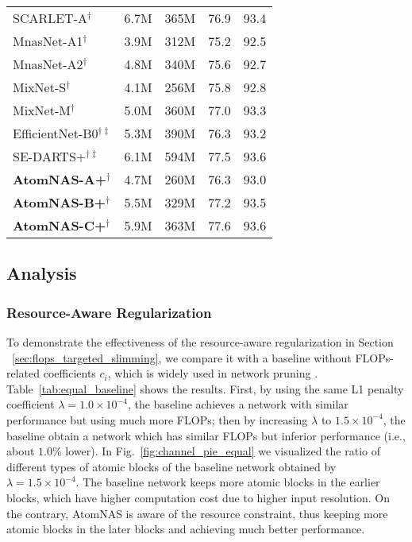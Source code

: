 \documentclass{article} \usepackage{iclr2020_conference,times}
\newcommand{\flops}{FLOPs\xspace}
\begin{document}
\begin{table}[t]
\begin{center}
\begin{tabular}{lllll}
\midrule

SCARLET-A$^\dag$ \citep{chu2019scarletnas} & 6.7M & 365M & 76.9 & 93.4 \\
MnasNet-A1$^\dag$ \citep{tan2019mnasnet}      & 3.9M & 312M & 75.2 & 92.5 \\
MnasNet-A2$^\dag$      & 4.8M & 340M & 75.6 & 92.7 \\
MixNet-S$^\dag$ \citep{tan2019mixnet}      & 4.1M & 256M & 75.8 & 92.8 \\
MixNet-M$^\dag$      & 5.0M & 360M & 77.0 & 93.3 \\
EfficientNet-B0$^{\dag \ddag}$ \citep{mingxing2019efficient} & 5.3M & 390M & 76.3 & 93.2 \\
SE-DARTS+$^{\dag \ddag}$ \citep{liang2019dartsplus} & 6.1M & 594M & 77.5 & 93.6 \\


\textbf{AtomNAS-A+}$^\dag$ & 4.7M & 260M & 76.3 & 93.0 \\
\textbf{AtomNAS-B+}$^\dag$ & 5.5M & 329M & 77.2 & 93.5 \\
\textbf{AtomNAS-C+}$^\dag$ & 5.9M & 363M & 77.6 & 93.6 \\
\bottomrule
\end{tabular}
\end{center}
\label{tab:overall_compare}
\end{table}


\subsection{Analysis}    
\label{sub:analysis}














\subsubsection{Resource-Aware Regularization}

To demonstrate the effectiveness of the resource-aware regularization in Section ~\ref{sec:flops_targeted_slimming}, we compare it with a baseline without \flops-related coefficients $c_i$, which is widely used in network pruning \citep{zhuang2017slimming,yihui2017channel}.
Table~\ref{tab:equal_baseline} shows the results. First, by using the same L1 penalty coefficient $\lambda=1.0 \times 10^{-4}$, the baseline achieves a network with similar performance but using much more \flops; then by increasing $\lambda$ to $1.5 \times 10^{-4}$, the baseline obtain a network which has similar \flops but inferior performance (i.e., about $1.0\%$ lower). In Fig.~\ref{fig:channel_pie_equal} we visualized the ratio of different types of atomic blocks of the baseline network obtained by $\lambda=1.5 \times 10^{-4}$. The baseline network keeps more atomic blocks in the earlier blocks, which have higher computation cost due to higher input resolution. On the contrary, AtomNAS is aware of the resource constraint, thus keeping more atomic blocks in the later blocks and achieving much better performance.
\end{document}
